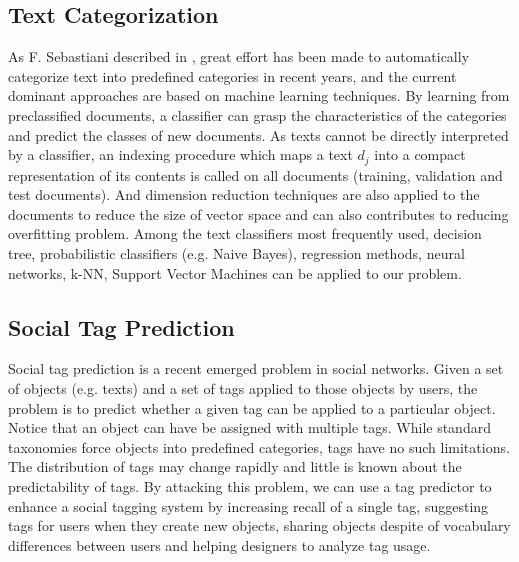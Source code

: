 
\subsection{Text Categorization}

As F. Sebastiani described in \cite{DBLP:journals/csur/Sebastiani02}, great effort has been made to automatically categorize text into predefined categories in recent years, and the current dominant approaches are based on machine learning techniques. By learning from preclassified documents, a classifier can grasp the characteristics of the categories and predict the classes of new documents. 
As texts cannot be directly interpreted by a classifier, an indexing procedure which maps a text $d_j$ into a compact representation of its contents is called on all documents (training, validation and test documents). And dimension reduction techniques are also applied to the documents to reduce the size of vector space and can also contributes to reducing overfitting problem. Among the text classifiers most frequently used, decision tree, probabilistic classifiers (e.g. Naive Bayes), regression methods, neural networks, k-NN, Support Vector Machines can be applied to our problem.

\subsection{Social Tag Prediction}
Social tag prediction \cite{DBLP:conf/sigir/HeymannRG08} is a recent emerged problem in social networks. Given a set of objects (e.g. texts) and a set of tags applied to those objects by users, the problem is to predict whether a given tag can be applied to a particular object. Notice that an object can have be assigned with multiple tags. While standard taxonomies force objects into predefined categories, tags have no such limitations. The distribution of tags may change rapidly and little is known about the predictability of tags. By attacking this problem, we can use a tag predictor to enhance a social tagging system by increasing recall of a single tag, suggesting tags for users when they create new objects, sharing objects despite of vocabulary differences between users and helping designers to analyze tag usage.